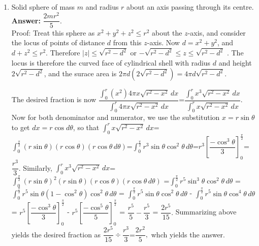 \documentclass[11pt,a4paper]{article}
\begin{document}
\begin{enumerate}
\item Solid sphere of mass $m$ and radius $r$ about an axis passing through its centre.\\
\textbf {Answer: } $\dfrac{2mr^2}{5}$.\\
Proof: Treat this sphere as $x^2+y^2+z^2\le r^2$ about the $z$-axis, and consider the locus of points of distance $d$ from this $z$-axis. Now $d=x^2+y^2$, and $d+z^2\le r^2$. Therefore $|z|\le\sqrt{r^2-d^2}$ or $-\sqrt{r^2-d^2}\le z\le\sqrt{r^2-d^2}$ . The locus is therefore the curved face of cylindrical shell with radius $d$ and height $2\sqrt{r^2-d^2}$, and the surace area is $2\pi d (2\sqrt{r^2-d^2})=4\pi d\sqrt{r^2-d^2}$.

The desired fraction is now $\dfrac{\int_0^r (x^2)4\pi x\sqrt{r^2-x^2}\,dx}{\int_0^r 4\pi x \sqrt{r^2-x^2}\,dx}$=$\dfrac{\int_0^r x^3\sqrt{r^2-x^2}\,dx}{\int_0^r x \sqrt{r^2-x^2}\,dx}$. Now for both denominator and numerator, we use the substitution $x=r\sin\theta$ to get $dx=r\cos d\theta$, so that $\int_0^r x \sqrt{r^2-x^2}\,dx$=$\int_0^{\frac{\pi}{2}} (r\sin\theta) (r\cos\theta) (r\cos\theta\,d\theta)$=$\int_0^{\frac{\pi}{2}} r^3\sin\theta\cos^2\theta\,d\theta$=$r^3\left[\dfrac{-\cos^3\theta}{3}\right]_0^{\frac{\pi}{2}}$=$\dfrac{r^3}{3}$. Similarly, $\int_0^r x^3\sqrt{r^2-x^2}\,dx$=$\int_0^{\frac{\pi}{2}} (r\sin\theta)^2(r\sin\theta) (r\cos\theta) (r\cos\theta\,d\theta)$ =$\int_0^{\frac{\pi}{2}} r^5\sin^3\theta\cos^2\theta\,d\theta$ = $\int_0^{\frac{\pi}{2}} r^5\sin\theta(1-\cos^2\theta)\cos^2\theta\,d\theta$ = $\int_0^{\frac{\pi}{2}} r^5\sin\theta\cos^2\theta\,d\theta$ - $\int_0^{\frac{\pi}{2}} r^5\sin\theta\cos^4\theta\,d\theta$ = 
$r^5\left[\dfrac{-\cos^3\theta}{3}\right]_0^{\frac{\pi}{2}}$ - $r^5\left[\dfrac{-\cos^5\theta}{5}\right]_0^{\frac{\pi}{2}}$ = $\dfrac{r^5}{5} - \dfrac{r^5}{3}$ = $\dfrac{2r^5}{15}.$ Summarizing above yields the desired fraction as $\dfrac{2r^5}{15}\div\dfrac{r^3}{3}$=$\dfrac{2r^2}{5},$ whch yields the answer.


\end{enumerate}
\end{document}
